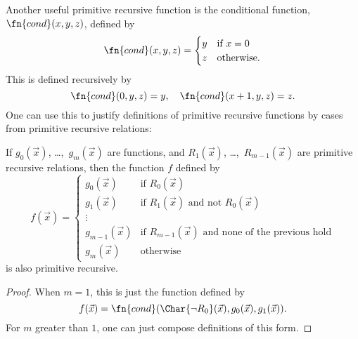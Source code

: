 \documentclass[../../../include/open-logic-section]{subfiles}
\begin{document}
Another useful primitive recursive function is the conditional
function, $\fn{cond}(x,y,z)$, defined by
\[
\fn{cond}(x,y,z) = \begin{cases}
  y & \text{if $x = 0$} \\
  z & \text{otherwise}.
\end{cases}
\]
This is defined recursively by
\[
\fn{cond}(0,y,z) = y, \quad \fn{cond}(x+1,y,z) = z.
\]
One can use this to justify definitions of primitive recursive functions
by cases from primitive recursive relations:

\begin{prop}
If $g_0(\vec x)$, \dots,~$g_m(\vec x)$ are functions, and $R_1(\vec
x)$, \dots,~$R_{m-1}(\vec x)$ are primitive recursive relations, then
the function $f$ defined by
\[
f(\vec x) = \begin{cases}
    g_0(\vec x) & \text{if $R_0(\vec{x})$} \\
    g_1(\vec x) & \text{if $R_1(\vec{x})$ and not $R_0(\vec{x})$} \\
    \vdots & \\
    g_{m-1}(\vec x) & \text{if $R_{m-1}(\vec{x})$ and none of the
      previous hold}
    \\
    g_m(\vec x) & \mbox{otherwise}
\end{cases}
\]
is also primitive recursive.
\end{prop}

\begin{proof}
  When $m = 1$, this is just the function defined by
  \[
  f(\vec x) = \fn{cond}(\Char{\lnot R_0}(\vec x),g_0(\vec x),g_1(\vec
  x)).
  \]
  For $m$ greater than $1$, one can just compose definitions of this
  form.
\end{proof}
\end{document}
